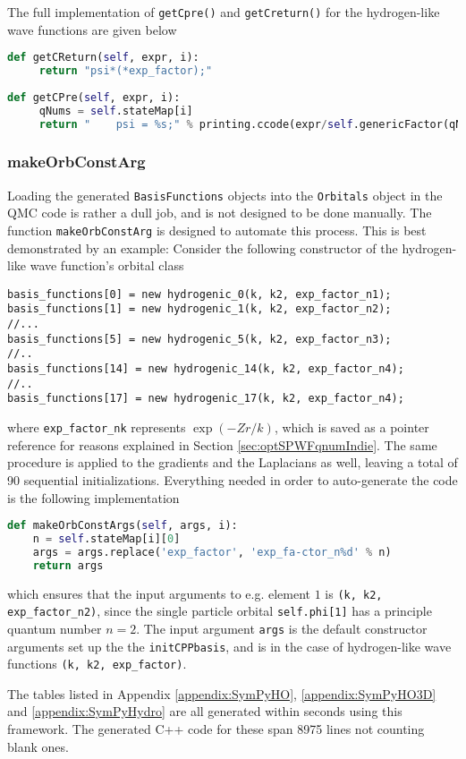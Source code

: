 The full implementation of \verb+getCpre()+ and \verb+getCreturn()+ for the hydrogen-like wave functions are given below

\vspace{0.5cm}
\begin{lstlisting}[language=Python, otherkeywords={self}]
def getCReturn(self, expr, i):
     return "psi*(*exp_factor);" 
     
def getCPre(self, expr, i):
     qNums = self.stateMap[i]
     return "    psi = %s;" % printing.ccode(expr/self.genericFactor(qNums))
\end{lstlisting}



\subsubsection{makeOrbConstArg}

Loading the generated \verb+BasisFunctions+ objects into the \verb+Orbitals+ object in the QMC code is rather a dull job, and is not designed to be done manually. The function \verb+makeOrbConstArg+ is designed to automate this process. This is best demonstrated by an example: Consider the following constructor of the hydrogen-like wave function's orbital class

\vspace{0.5cm}
\begin{lstlisting}
basis_functions[0] = new hydrogenic_0(k, k2, exp_factor_n1);
basis_functions[1] = new hydrogenic_1(k, k2, exp_factor_n2);
//...
basis_functions[5] = new hydrogenic_5(k, k2, exp_factor_n3);
//..
basis_functions[14] = new hydrogenic_14(k, k2, exp_factor_n4);
//..
basis_functions[17] = new hydrogenic_17(k, k2, exp_factor_n4);
\end{lstlisting}

where \verb+exp_factor_nk+ represents $\exp(-Zr/k)$, which is saved as a pointer reference for reasons explained in Section \ref{sec:optSPWFqnumIndie}. The same procedure is applied to the gradients and the Laplacians as well, leaving a total of 90 sequential initializations. Everything needed in order to auto-generate the code is the following implementation

\vspace{0.5cm}
\begin{lstlisting}[language=Python, otherkeywords={self}]
def makeOrbConstArgs(self, args, i):
    n = self.stateMap[i][0]
    args = args.replace('exp_factor', 'exp_fa-ctor_n%d' % n)
    return args
\end{lstlisting}

which ensures that the input arguments to e.g. element $1$ is \verb+(k, k2, exp_factor_n2)+, since the single particle orbital \verb+self.phi[1]+ has a principle quantum number $n=2$. The input argument \verb+args+ is the default constructor arguments set up the the \verb+initCPPbasis+, and is in the case of hydrogen-like wave functions \verb+(k, k2, exp_factor)+.

The tables listed in Appendix \ref{appendix:SymPyHO}, \ref{appendix:SymPyHO3D} and \ref{appendix:SymPyHydro} are all generated within seconds using this framework. The generated C++ code for these span 8975 lines not counting blank ones.